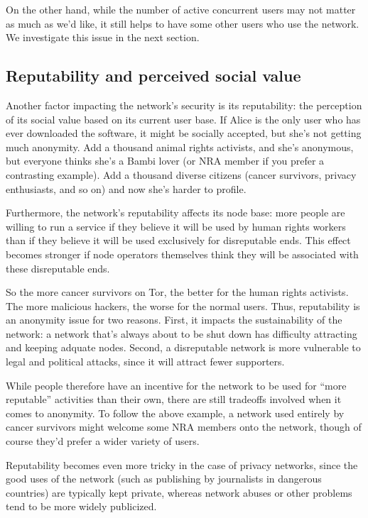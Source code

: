 \documentclass{llncs}
\begin{document}

On the other hand, while the number of active concurrent users may not
matter as much as we'd like, it still helps to have some other users
who use the network. We investigate this issue in the next section.

\subsection{Reputability and perceived social value}
Another factor impacting the network's security is its reputability:
the perception of its social value based on its current user base. If Alice is
the only user who has ever downloaded the software, it might be socially
accepted, but she's not getting much anonymity. Add a thousand animal rights
activists, and she's anonymous, but everyone thinks she's a Bambi lover (or
NRA member if you prefer a contrasting example). Add a thousand
diverse citizens (cancer survivors, privacy enthusiasts, and so on)
and now she's harder to profile.

Furthermore, the network's reputability affects its node base: more people
are willing to run a service if they believe it will be used by human rights
workers than if they believe it will be used exclusively for disreputable
ends.  This effect becomes stronger if node operators themselves think they
will be associated with these disreputable ends.

So the more cancer survivors on Tor, the better for the human rights
activists. The more malicious hackers, the worse for the normal users. Thus,
reputability is an anonymity issue for two reasons. First, it impacts
the sustainability of the network: a network that's always about to be
shut down has difficulty attracting and keeping adquate nodes.
Second, a disreputable network is more vulnerable to legal and
political attacks, since it will attract fewer supporters.

While people therefore have an incentive for the network to be used for
``more reputable'' activities than their own, there are still tradeoffs
involved when it comes to anonymity. To follow the above example, a
network used entirely by cancer survivors might welcome some NRA members
onto the network, though of course they'd prefer a wider
variety of users.

Reputability becomes even more tricky in the case of privacy networks,
since the good uses of the network (such as publishing by journalists in
dangerous countries) are typically kept private, whereas network abuses
or other problems tend to be more widely publicized.
\end{document}
